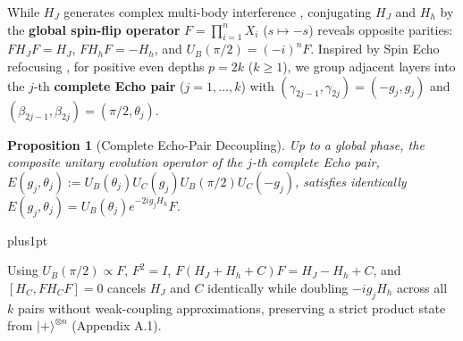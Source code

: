 \documentclass{article}
\makeatletter
\renewenvironment{proof}[1][\proofname]{\par
  \pushQED{\qed}%
  \normalfont \topsep1pt plus1pt\relax
  \trivlist
  \item[\hskip\labelsep
        \itshape
    #1\@addpunct{.}]\ignorespaces
}{%
  \popQED\endtrivlist\@endpefalse
}
\theoremstyle{plain}
\newtheorem{proposition}{Proposition}
\theoremstyle{definition}
\makeatother
\begin{document}
While $H_J$ generates complex multi-body interference \citep{bravyi2020obstacles,herrman2022multi}, conjugating $H_J$ and $H_h$ by the \textbf{global spin-flip operator} $F=\prod_{i=1}^n X_i$ ($s\mapsto -s$) reveals opposite parities: $FH_JF=H_J$, $FH_hF=-H_h$, and $U_B(\pi/2)=(-i)^nF$. Inspired by Spin Echo refocusing \citep{carr1954effects,hahn1950spin,vandersypen2005nmr,viola1999dynamical}, for positive even depths $p=2k$ ($k\ge 1$), we group adjacent layers into the $j$-th \textbf{complete Echo pair} ($j=1,\ldots,k$) with $(\gamma_{2j-1},\gamma_{2j})=(-g_j,g_j)$ and $(\beta_{2j-1},\beta_{2j})=(\pi/2,\theta_j)$.

\begin{proposition}[Complete Echo-Pair Decoupling]
\label{prop:1}
Up to a global phase, the composite unitary evolution operator of the $j$-th complete Echo pair, $E(g_j,\theta_j):=U_B(\theta_j)U_C(g_j)U_B(\pi/2)U_C(-g_j)$, satisfies identically $E(g_j,\theta_j)=U_B(\theta_j)e^{-2ig_jH_h}F$.
\end{proposition}

\begin{proof}[Proof Sketch]
Using $U_B(\pi/2)\propto F$, $F^2=I$, $F(H_J+H_h+C)F=H_J-H_h+C$, and $[H_C,FH_CF]=0$ cancels $H_J$ and $C$ identically while doubling $-ig_jH_h$ across all $k$ pairs without weak-coupling approximations, preserving a strict product state from $|+\rangle^{\otimes n}$ (Appendix A.1).
\end{proof}
\end{document}
